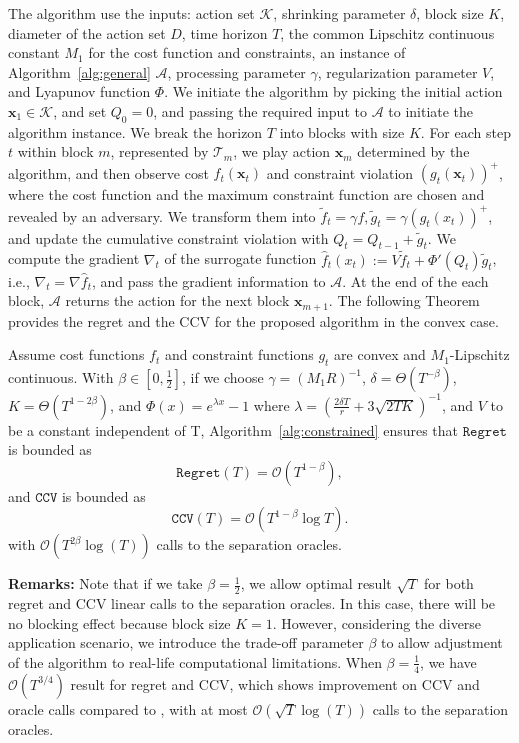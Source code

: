\documentclass[twoside,11pt,]{article}
\newcommand{\C}[1]{\mathcal{#1}}
\newcommand{\BF}[1]{\mathbf{#1}}
\newcommand{\K}{\C{K}}
\newcommand{\x}{\BF{x}}
\newcommand{\hft}{\hat{f}_t}
\renewcommand{\cite}[1]{\citep{#1}}
\begin{document}
The algorithm use the inputs: action set $\K$, shrinking parameter $\delta$, block size $K$, diameter of the action set $D$, time horizon $T$, the common Lipschitz continuous constant $M_1$ for the cost function and constraints, an instance of Algorithm~\ref{alg:general} $\C{A}$, processing parameter $\gamma$, regularization parameter $V$, and Lyapunov function $\Phi$. 
We initiate the algorithm by picking the initial action  $\x_1\in\K$, and set $Q_0=0$, and passing the required input to $\C{A}$ to initiate the algorithm instance. 
We break the horizon $T$ into blocks with size $K$. 
For each step $t$ within block $m$, represented by $\C{T}_m$, we play action $\x_m$ determined by the algorithm, and then observe cost $f_t(\x_t)$ and constraint violation $(g_t(\x_t))^+$, where the cost function and the maximum constraint function are chosen and revealed by an adversary. 
We transform them into $\tilde{f}_t = \gamma f, \tilde{g}_t =\gamma (g_t(x_t))^+$, and update the cumulative constraint violation with $Q_t = Q_{t-1}+\tilde{g}_t$. 
We compute the gradient $\nabla_t$ of the surrogate function $\hat{f}_t(x_t):=V\tilde{f}_t + \Phi'(Q_t)\tilde{g}_t$, i.e., $\nabla_t=\nabla \hft$, and pass the gradient information to $\C{A}$.
At the end of the each block, $\C{A}$ returns the action for the next block $\x_{m+1}$. 
The following Theorem provides the regret and the CCV for the proposed algorithm in the convex case. 
\begin{theorem}
\label{thm:main}
    Assume cost functions $f_t$ and constraint functions $g_t$ are convex and $M_1$-Lipschitz continuous.
    With $\beta\in[0,\frac{1}{2}]$, if we choose $\gamma=(M_1R)^{-1}$, $\delta=\Theta(T^{-\beta})$, $K= \Theta(T^{1-2\beta})$, and $\Phi(x)=e^{\lambda x}-1$ where $\lambda=(\frac{2\delta T}{r} + 3\sqrt{2TK})^{-1}$, and $V$ to be a constant independent of T,
    Algorithm~\ref{alg:constrained} ensures that $\mathtt{Regret}$ is bounded as
    \begin{equation*}
        \mathtt{Regret}(T) =  \C{O}(T^{1-\beta}),
    \end{equation*}
    and $\mathtt{CCV}$ is bounded as
    \begin{equation*}
        \mathtt{CCV}(T) = \C{O}(T^{1-\beta}\log T).
    \end{equation*}    
    with $\C{O}(T^{2\beta}\log(T))$ calls to the separation oracles.
\end{theorem}
\textbf{Remarks:} Note that if we take $\beta=\frac{1}{2}$, we allow optimal result $\sqrt{T}$ for both regret and CCV linear calls to the separation oracles. In this case, there will be no blocking effect because block size $K=1$. 
However, considering the diverse application scenario, we introduce the trade-off parameter $\beta$ to allow adjustment of the algorithm to real-life computational limitations.
When $\beta=\frac{1}{4}$, we have $\C{O}(T^{3/4})$ result for regret and CCV, which shows improvement on CCV and oracle calls compared to \cite{garber2024projection}, with at most $\C{O}(\sqrt{T}\log(T))$ calls to the separation oracles.
\end{document}
